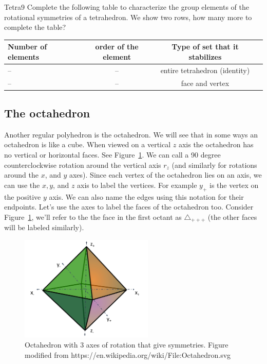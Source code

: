 \begin{exercise}{Tetra9}
Complete the following table to characterize the group elements of the rotational symmetries of a tetrahedron.  We show two rows, how many more to complete the table?
  
\begin{tabular}{| l |c|c| r |} \hline
  Number of elements & order of the element & Type of set that it stabilizes \\ \hline
  --&  --& entire tetrahedron (identity) \\ \hline
  -- & --& face and vertex \\  
\end{tabular}
\end{exercise}
\subsection{The octahedron}
Another regular polyhedron is the octahedron.  We will see that in some ways an octahedron is like a cube. 
When viewed on a vertical $z$ axis the octahedron has no vertical or horizontal faces.  See Figure~\ref{fig:OctaRot}.  We can call a 90 degree counterclockwise rotation around the vertical axis $r_z$ (and similarly for rotations around the $x$, and $y$ axes).
Since each vertex of the octahedron lies on an axis, we can use the $x,y$, and $z$ axis to label the vertices.  For example $y_+$ is the vertex on the positive $y$ axis.   We can also name the edges using this notation for their endpoints.   Let's use the axes to label the faces of the octahedron too.  Consider Figure~\ref{fig:OctaRot}, we'll refer to the the face in the first octant as $\triangle_{ +++}$ (the other faces will be labeled similarly).

\begin{figure}[ht]
\begin{center}
\includegraphics[width=2.5in]{images/AxesOfOctahedron.png}
\caption{Octahedron with 3 axes of rotation that give symmetries. Figure modified from https://en.wikipedia.org/wiki/File:Octahedron.svg
}\label{fig:OctaRot}
\end{center}
\end{figure}


